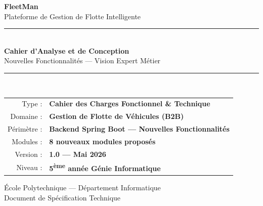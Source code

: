 \documentclass[12pt,a4paper]{report}
\begin{document}
\begin{titlepage}
  \pagecolor{fleetdark}
  \color{white}
  \centering
  \vspace*{1.5cm}

  {\fontsize{55}{66}\selectfont\bfseries\textcolor{fleetblue}{FleetMan}}\\[0.4cm]
  {\Large\textcolor{white!70}{Plateforme de Gestion de Flotte Intelligente}}\\[2.5cm]

  \textcolor{fleetblue}{\rule{0.85\textwidth}{2pt}}\\[0.8cm]

  {\LARGE\bfseries Cahier d'Analyse et de Conception}\\[0.4cm]
  {\large Nouvelles Fonctionnalités — Vision Expert Métier}\\[0.8cm]

  \textcolor{fleetblue}{\rule{0.85\textwidth}{1pt}}\\[1.8cm]

  \begin{tabular}{rl}
    \textcolor{white!60}{Type :}         & \textbf{Cahier des Charges Fonctionnel \& Technique} \\[0.3cm]
    \textcolor{white!60}{Domaine :}      & \textbf{Gestion de Flotte de Véhicules (B2B)} \\[0.3cm]
    \textcolor{white!60}{Périmètre :}    & \textbf{Backend Spring Boot — Nouvelles Fonctionnalités} \\[0.3cm]
    \textcolor{white!60}{Modules :}      & \textbf{8 nouveaux modules proposés} \\[0.3cm]
    \textcolor{white!60}{Version :}      & \textbf{1.0 — Mai 2026} \\[0.3cm]
    \textcolor{white!60}{Niveau :}       & \textbf{5\textsuperscript{ème} année Génie Informatique} \\
  \end{tabular}

  \vfill

  {\small\textcolor{white!50}{École Polytechnique — Département Informatique}}\\
  {\small\textcolor{white!50}{Document de Spécification Technique}}
\end{titlepage}
\nopagecolor

\tableofcontents
\newpage
\end{document}
